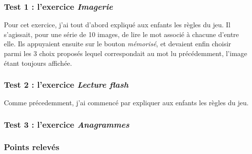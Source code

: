 \subsubsection{Test 1 : l'exercice \textit{Imagerie}}
Pour cet exercice, j'ai tout d'abord expliqué aux enfants les règles du jeu. Il s'agissait, pour une série de 10 images, de lire le mot associé à chacune d'entre elle. Ils appuyaient ensuite sur le bouton \textit{mémorisé}, et devaient enfin choisir parmi les 3 choix proposés lequel correspondait au mot lu précédemment, l'image étant toujours affichée.

\subsubsection{Test 2 : l'exercice \textit{Lecture flash}}
Comme précedemment, j'ai commencé par expliquer aux enfants les règles du jeu.

\subsubsection{Test 3 : l'exercice \textit{Anagrammes}}


\subsubsection{Points relevés}